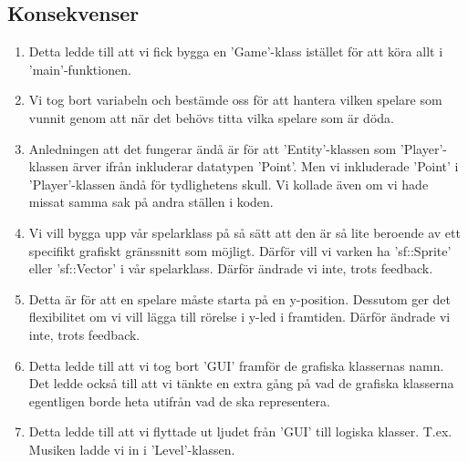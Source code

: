 \documentclass{TDP003mall}
\begin{document}
\subsection{Konsekvenser}
\begin{enumerate}
\item Detta ledde till att vi fick bygga en 'Game'-klass istället för att köra allt i 'main'-funktionen.
\item Vi tog bort variabeln och bestämde oss för att hantera vilken spelare som vunnit genom att när det behövs titta vilka spelare som är döda.
\item Anledningen att det fungerar ändå är för att 'Entity'-klassen som 'Player'-klassen ärver ifrån inkluderar datatypen 'Point'. Men vi inkluderade 'Point' i 'Player'-klassen ändå för tydlighetens skull. Vi kollade även om vi hade missat samma sak på andra ställen i koden.
\item Vi vill bygga upp vår spelarklass på så sätt att den är så lite beroende av ett specifikt grafiskt gränssnitt som möjligt. Därför vill vi varken ha 'sf::Sprite' eller 'sf::Vector' i vår spelarklass. Därför ändrade vi inte, trots feedback.
\item Detta är för att en spelare måste starta på en y-position. Dessutom ger det flexibilitet om vi vill lägga till rörelse i y-led i framtiden. Därför ändrade vi inte, trots feedback.
\item Detta ledde till att vi tog bort 'GUI' framför de grafiska klassernas namn. Det ledde också till att vi tänkte en extra gång på vad de grafiska klasserna egentligen borde heta utifrån vad de ska representera.
\item Detta ledde till att vi flyttade ut ljudet från 'GUI' till logiska klasser. T.ex. Musiken ladde vi in i 'Level'-klassen.
\end{enumerate}
\end{document}
